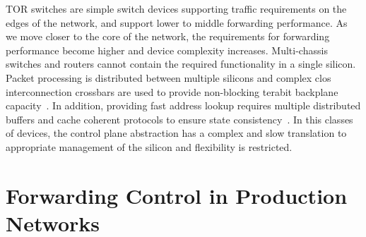 TOR switches are simple switch devices supporting traffic requirements on the
edges of the network, and support lower to middle forwarding performance. As we
move closer to the core of the network, the requirements for forwarding
performance become higher and device complexity increases. Multi-chassis
switches and routers cannot contain the required functionality in a single
silicon. Packet processing is distributed between multiple silicons and complex
clos interconnection crossbars are used to provide non-blocking terabit
backplane capacity~\cite{juniper_t_series}. In addition, providing fast address lookup
requires multiple distributed buffers and cache coherent protocols to ensure
state consistency~\cite{cisco_cef}. In this classes of devices, the control 
plane abstraction has a complex and slow translation to appropriate management 
of the silicon and flexibility is restricted.  


\section{Forwarding Control in Production Networks} \label{sec:backoground:netcontrol}

% 

